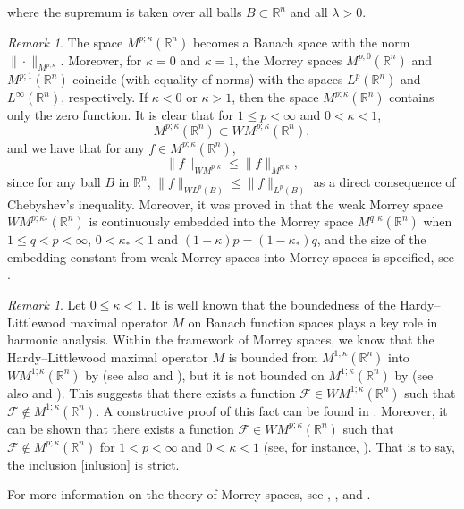 \documentclass{birkjour}
\theoremstyle{definition}
\theoremstyle{remark}
\newtheorem{rem}[thm]{Remark}
\numberwithin{equation}{section}
\begin{document}
where the supremum is taken over all balls $B\subset\mathbb R^n$ and all $\lambda>0$.
\begin{rem}
The space $M^{p;\kappa}(\mathbb R^n)$ becomes a Banach space with the norm $\|\cdot\|_{M^{p;\kappa}}$. Moreover, for $\kappa=0$ and $\kappa=1$, the Morrey spaces $M^{p;0}(\mathbb R^n)$ and $M^{p;1}(\mathbb R^n)$ coincide (with equality of norms) with the spaces $L^p(\mathbb R^n)$ and $L^{\infty}(\mathbb R^n)$, respectively. If $\kappa<0$ or $\kappa>1$, then the space $M^{p;\kappa}(\mathbb R^n)$ contains only the zero function.
It is clear that for $1\leq p<\infty$ and $0<\kappa<1$,
\begin{equation}\label{inlusion}
M^{p;\kappa}(\mathbb R^n)\subset WM^{p;\kappa}(\mathbb R^n),
\end{equation}
and we have that for any $f\in M^{p;\kappa}(\mathbb R^n)$,
\begin{equation*}
\|f\|_{WM^{p;\kappa}}\leq\|f\|_{M^{p;\kappa}},
\end{equation*}
since for any ball $B$ in $\mathbb R^n$, $\|f\|_{WL^p(B)}\leq \|f\|_{L^p(B)}$ as a direct consequence of Chebyshev's inequality. Moreover, it was proved in \cite{gun} that the weak Morrey space $WM^{p;\kappa_*}(\mathbb R^n)$ is continuously embedded into the Morrey space $M^{q;\kappa}(\mathbb R^n)$ when $1\leq q<p<\infty$, $0<\kappa_*<1$ and $(1-\kappa)p=(1-\kappa_*)q$, and the size of the embedding constant from weak Morrey spaces into Morrey spaces is specified, see \cite[Theorem 1.1]{gun}.
\end{rem}

\begin{rem}
Let $0\leq\kappa<1$. It is well known that the boundedness of the Hardy--Littlewood maximal operator $M$ on Banach function spaces plays a key role in harmonic analysis. Within the framework of Morrey spaces, we know that the Hardy--Littlewood maximal operator $M$ is bounded from $M^{1;\kappa}(\mathbb R^n)$ into $WM^{1;\kappa}(\mathbb R^n)$ by \cite{chia} (see also \cite[Theorem 3.2]{komori} and \cite[Theorem 1]{nakai2}), but it is not bounded on $M^{1;\kappa}(\mathbb R^n)$ by \cite{nakai} (see also \cite[Proposition 6.1]{lida} and \cite[Lemma 3.5]{sawano}). This suggests that there exists a function $\mathcal{F}\in WM^{1;\kappa}(\mathbb R^n)$ such that $\mathcal{F}\notin M^{1;\kappa}(\mathbb R^n)$. A constructive proof of this fact can be found in \cite{gun}. Moreover, it can be shown that there exists a function $\mathcal{F}\in WM^{p;\kappa}(\mathbb R^n)$ such that $\mathcal{F}\notin M^{p;\kappa}(\mathbb R^n)$ for $1<p<\infty$ and $0<\kappa<1$ (see, for instance, \cite[Theorem 1.2]{gun}). That is to say, the inclusion \eqref{inlusion} is strict.
\end{rem}
For more information on the theory of Morrey spaces, see \cite{adams}, \cite{adams1}, \cite{adamsxiao} and \cite{peetre}.
\end{document}
